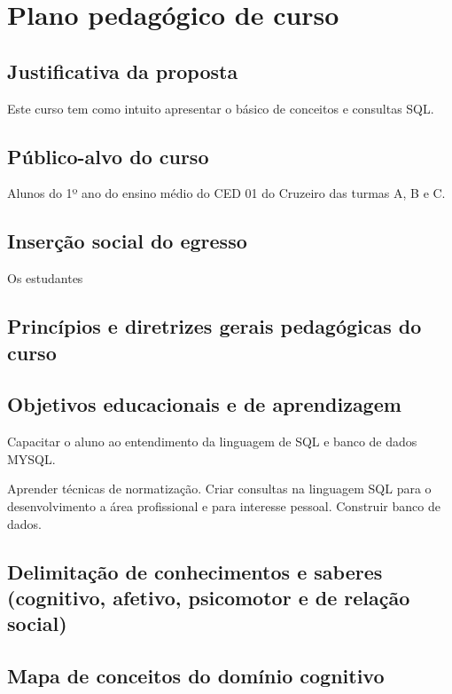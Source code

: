\newpage
\chapter{Plano pedagógico de curso}

\section{Justificativa da proposta}

Este curso tem como intuito apresentar o básico de conceitos e consultas SQL.

\section{Público-alvo do curso}

Alunos do 1º ano do ensino médio do CED 01 do Cruzeiro das turmas A, B e C.

\section{Inserção social do egresso}

Os estudantes 

\section{Princípios e diretrizes gerais pedagógicas do curso}

\section{Objetivos educacionais e de aprendizagem}

Capacitar o aluno ao entendimento da linguagem de SQL e banco de dados MYSQL.

Aprender técnicas de normatização.
Criar consultas na linguagem SQL para o desenvolvimento a área profissional e para interesse pessoal.
Construir banco de dados.

\section{Delimitação de conhecimentos e saberes (cognitivo, afetivo, psicomotor e  de relação social)}



\section{Mapa de conceitos do domínio cognitivo}



